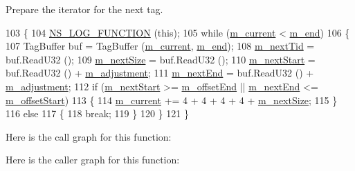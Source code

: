 Prepare the iterator for the next tag. 


\begin{DoxyCode}
103 \{
104   \hyperlink{log-macros-disabled_8h_a90b90d5bad1f39cb1b64923ea94c0761}{NS\_LOG\_FUNCTION} (\textcolor{keyword}{this});
105   \textcolor{keywordflow}{while} (\hyperlink{classns3_1_1ByteTagList_1_1Iterator_a12d17a309f11f53143033cb31a351fa6}{m\_current} < \hyperlink{classns3_1_1ByteTagList_1_1Iterator_afda983adc3e638e0bc6d1b3eb2e1087e}{m\_end})
106     \{
107       TagBuffer buf = TagBuffer (\hyperlink{classns3_1_1ByteTagList_1_1Iterator_a12d17a309f11f53143033cb31a351fa6}{m\_current}, \hyperlink{classns3_1_1ByteTagList_1_1Iterator_afda983adc3e638e0bc6d1b3eb2e1087e}{m\_end});
108       \hyperlink{classns3_1_1ByteTagList_1_1Iterator_af0da490a20b9003e24e8aae05a49e6cc}{m\_nextTid} = buf.ReadU32 ();
109       \hyperlink{classns3_1_1ByteTagList_1_1Iterator_aa23792f1290917fa1e420b2bd5462dc9}{m\_nextSize} = buf.ReadU32 ();
110       \hyperlink{classns3_1_1ByteTagList_1_1Iterator_a6b24dab16b41ceda94847795a556c29b}{m\_nextStart} = buf.ReadU32 () + \hyperlink{classns3_1_1ByteTagList_1_1Iterator_a1a2f740d59491d621690a0480c76a056}{m\_adjustment};
111       \hyperlink{classns3_1_1ByteTagList_1_1Iterator_a53fc6ccb52767deef09ae800ed6e8358}{m\_nextEnd} = buf.ReadU32 () + \hyperlink{classns3_1_1ByteTagList_1_1Iterator_a1a2f740d59491d621690a0480c76a056}{m\_adjustment};
112       \textcolor{keywordflow}{if} (\hyperlink{classns3_1_1ByteTagList_1_1Iterator_a6b24dab16b41ceda94847795a556c29b}{m\_nextStart} >= \hyperlink{classns3_1_1ByteTagList_1_1Iterator_a1c1d1db54dc1eae50373416f74bfd814}{m\_offsetEnd} || \hyperlink{classns3_1_1ByteTagList_1_1Iterator_a53fc6ccb52767deef09ae800ed6e8358}{m\_nextEnd} <= 
      \hyperlink{classns3_1_1ByteTagList_1_1Iterator_a9cee01030bde8d16fa4916ab99d6b47d}{m\_offsetStart})
113         \{
114           \hyperlink{classns3_1_1ByteTagList_1_1Iterator_a12d17a309f11f53143033cb31a351fa6}{m\_current} += 4 + 4 + 4 + 4 + \hyperlink{classns3_1_1ByteTagList_1_1Iterator_aa23792f1290917fa1e420b2bd5462dc9}{m\_nextSize};
115         \}
116       \textcolor{keywordflow}{else}
117         \{
118           \textcolor{keywordflow}{break};
119         \}
120     \}
121 \}
\end{DoxyCode}


Here is the call graph for this function\+:




Here is the caller graph for this function\+:




